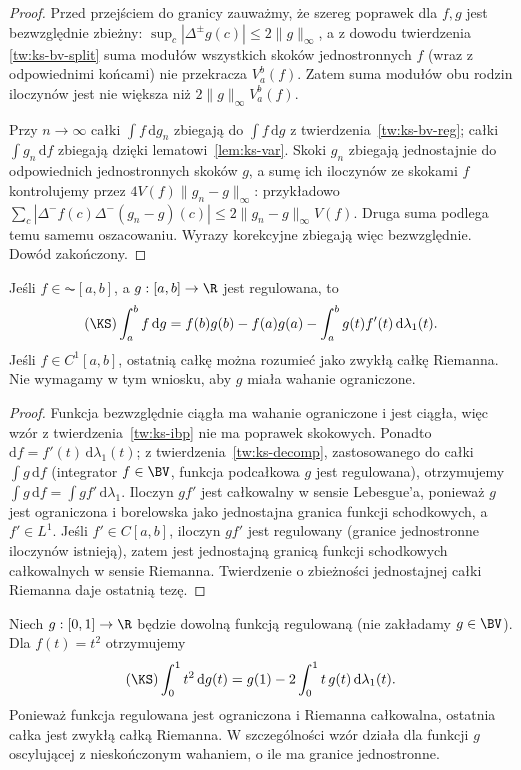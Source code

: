 \begin{proof}
Przed przejściem do granicy zauważmy, że szereg poprawek dla $f,g$ jest bezwzględnie zbieżny: $\sup_c|\Delta^\pm g(c)|\le2\|g\|_\infty$, a z dowodu twierdzenia \ref{tw:ks-bv-split} suma modułów wszystkich skoków jednostronnych $f$ (wraz z odpowiednimi końcami) nie przekracza $V_a^b(f)$. Zatem suma modułów obu rodzin iloczynów jest nie większa niż $2\|g\|_\infty V_a^b(f)$. 

Przy $n\to\infty$ całki $\int f\,\mathrm dg_n$ zbiegają do $\int f\,\mathrm dg$ z twierdzenia~\ref{tw:ks-bv-reg}; całki $\int g_n\,\mathrm df$ zbiegają dzięki lematowi~\ref{lem:ks-var}. Skoki $g_n$ zbiegają jednostajnie do odpowiednich jednostronnych skoków $g$, a sumę ich iloczynów ze skokami $f$ kontrolujemy przez $4V(f)\|g_n-g\|_\infty$: przykładowo $\sum_c|\Delta^-f(c)\Delta^-(g_n-g)(c)|\le2\|g_n-g\|_\infty V(f)$. Druga suma podlega temu samemu oszacowaniu. Wyrazy korekcyjne zbiegają więc bezwzględnie. Dowód zakończony.
\end{proof}

\begin{wniosek}
\label{wn:ks-ibp-ac}
Jeśli $f\in\AC[a,b]$, a $g:[a,b]\to\R$ jest regulowana, to
\[
 (\KS)\int_a^b f\,\mathrm dg
 =f(b)g(b)-f(a)g(a)-\int_a^b g(t)f'(t)\,\mathrm d\lambda_1(t).
\]
Jeśli $f\in C^1[a,b]$, ostatnią całkę można rozumieć jako zwykłą całkę Riemanna. Nie wymagamy w tym wniosku, aby $g$ miała wahanie ograniczone.
\end{wniosek}
\begin{proof}
Funkcja bezwzględnie ciągła ma wahanie ograniczone i jest ciągła, więc wzór z twierdzenia~\ref{tw:ks-ibp} nie ma poprawek skokowych. Ponadto $\mathrm df=f'(t)\,\mathrm d\lambda_1(t)$; z twierdzenia~\ref{tw:ks-decomp}, zastosowanego do całki $\int g\,\mathrm df$ (integrator $f\in\BV$, funkcja podcałkowa $g$ jest regulowana), otrzymujemy $\int g\,\mathrm df=\int gf'\,\mathrm d\lambda_1$. Iloczyn $gf'$ jest całkowalny w sensie Lebesgue'a, ponieważ $g$ jest ograniczona i borelowska jako jednostajna granica funkcji schodkowych, a $f'\in L^1$. Jeśli $f'\in C[a,b]$, iloczyn $gf'$ jest regulowany (granice jednostronne iloczynów istnieją), zatem jest jednostajną granicą funkcji schodkowych całkowalnych w sensie Riemanna. Twierdzenie o zbieżności jednostajnej całki Riemanna daje ostatnią tezę.
\end{proof}

\begin{przyklad}
Niech $g:[0,1]\to\R$ będzie dowolną funkcją regulowaną (nie zakładamy $g\in\BV$). Dla $f(t)=t^2$ otrzymujemy
\[
 (\KS)\int_0^1 t^2\,\mathrm dg(t)=g(1)-2\int_0^1 t\,g(t)\,\mathrm d\lambda_1(t).
\]
Ponieważ funkcja regulowana jest ograniczona i Riemanna całkowalna, ostatnia całka jest zwykłą całką Riemanna. W szczególności wzór działa dla funkcji $g$ oscylującej z nieskończonym wahaniem, o ile ma granice jednostronne.
\end{przyklad}

